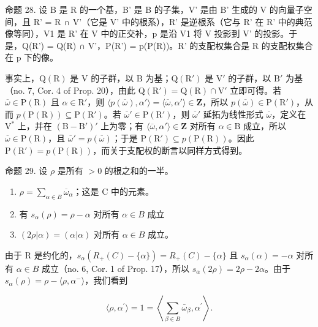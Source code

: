 命题 28. 设 B 是 R 的一个基，B' 是 B 的子集，V' 是由 B' 生成的 V 的向量子空间，且 R' = R ∩ V'（它是 V' 中的根系），R' 是逆根系（它与 R' 在 R' 中的典范像等同），V1 是 R' 在 V 中的正交补，p 是沿 V1 将 V 投影到 V' 的投影。于是，Q(R') = Q(R) ∩ V'，P(R') = p(P(R))。R' 的支配权集合是 R 的支配权集合在 p 下的像。

事实上，\(\mathrm{Q}(\mathrm{R})\) 是 \(\mathrm{V}\) 的子群，以 \(\mathrm{B}\) 为基；\(\mathrm{Q}(\mathrm{R}')\) 是 \(\mathrm{V}'\) 的子群，以 \(\mathrm{B}'\) 为基（no. 7, Cor. 4 of Prop. 20），由此 \(\mathrm{Q}(\mathrm{R}') = \mathrm{Q}(\mathrm{R}) \cap \mathrm{V}'\) 立即可得。若 \(\overline{\omega} \in \mathrm{P}(\mathrm{R})\) 且 \(\alpha \in \mathrm{R}'\)，则 \(\langle p(\overline{\omega}), \alpha' \rangle = \langle \overline{\omega}, \alpha' \rangle \in \mathbf{Z}\)，所以 \(p(\overline{\omega}) \in \mathrm{P}(\mathrm{R}')\)，从而 \(p(\mathrm{P}(\mathrm{R})) \subseteq \mathrm{P}(\mathrm{R}')\)。若 \(\overline{\omega}' \in \mathrm{P}(\mathrm{R}')\)，则 \(\overline{\omega}'\) 延拓为线性形式 \(\overline{\omega}\)，定义在 \(\mathrm{V}^*\) 上，并在 \((\mathrm{B} - \mathrm{B}')'\) 上为零；有 \(\langle \overline{\omega}, \alpha' \rangle \in \mathbf{Z}\) 对所有 \(\alpha \in \mathrm{B}\) 成立，所以 \(\overline{\omega} \in \mathrm{P}(\mathrm{R})\)，且 \(\overline{\omega}' = p(\overline{\omega})\)；于是 \(\mathrm{P}(\mathrm{R}') \subseteq p(\mathrm{P}(\mathrm{R}))\)。因此 \(\mathrm{P}(\mathrm{R}') = p(\mathrm{P}(\mathrm{R}))\)，而关于支配权的断言以同样方式得到。

命题 29. 设 \(\rho\) 是所有 \(>0\) 的根之和的一半。

\begin{enumerate}
\def\labelenumi{(\roman{enumi})}
\item
  \(\rho = \sum_{\alpha \in B} \overline{\omega}_{\alpha}\)；这是 C 中的元素。
\item
  有 \(s_{\alpha}(\rho) = \rho -\alpha\) 对所有 \(\alpha \in B\) 成立
\item
  \((2\rho |\alpha) = (\alpha |\alpha)\) 对所有 \(\alpha \in B\) 成立。
\end{enumerate}

由于 R 是约化的，\(s_{\alpha}(R_{+}(C) - \{\alpha\}) = R_{+}(C) - \{\alpha\}\) 且 \(s_{\alpha}(\alpha) = -\alpha\) 对所有 \(\alpha \in B\) 成立（no. 6, Cor. 1 of Prop. 17），所以 \(s_{\alpha}(2\rho) = 2\rho - 2\alpha\)。由于 \(s_{\alpha}(\rho) = \rho - \langle \rho, \alpha^{-} \rangle\)，我们看到

\[
\langle \rho , \alpha^ {\prime} \rangle = 1 = \left\langle \sum_ {\beta \in B} \bar {\omega} _ {\beta}, \alpha^ {\prime} \right\rangle .
\]

